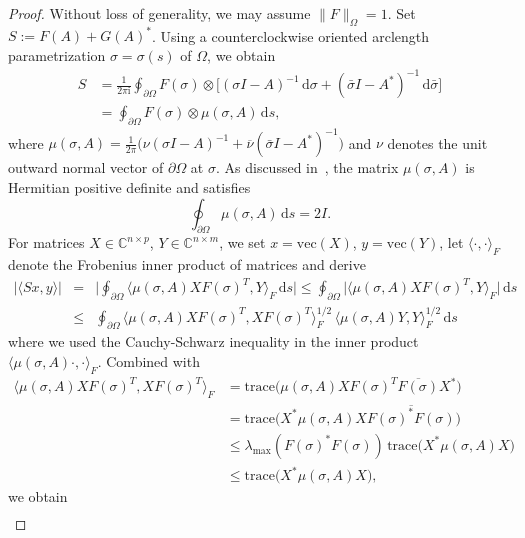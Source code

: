 \documentclass[11pt,a4paper]{amsart}
\newcommand{\C}{{\mathbb C}}
\begin{document}
\begin{proof}
Without loss of generality, we may assume $\|F\|_\Omega = 1$.
Set $S:=F(A)+G(A)^*$. Using a counterclockwise oriented arclength parametrization $\sigma = \sigma(s)$ of $\Omega$, we obtain 
\begin{align*}
 S & = \frac{1}{2\pi \mathrm{i}} \oint_{\partial \Omega} F(\sigma) \otimes \big[ (\sigma I -A)^{-1} \,\mathrm{d}\sigma + (\bar \sigma I -A^*)^{-1} \,\mathrm{d}\bar \sigma \big]  \\
 &= 
 \oint_{\partial \Omega} F(\sigma) \otimes \mu(\sigma,A)\,\mathrm{d}s,
\end{align*}
where $\mu(\sigma,A) = \frac{1}{2\pi}\big(\nu (\sigma I - A)^{-1} + \overline \nu (\bar \sigma I -A^*)^{-1}\big)$ and $\nu$ denotes the unit outward normal vector of $\partial \Omega$ at $\sigma$. As discussed in~\cite[Sec. 2]{CrouzeixPalencia2017}, the matrix $\mu(\sigma,A)$ is Hermitian positive definite and satisfies
\[
 \oint_{\partial \Omega} \mu(\sigma,A)\,\mathrm{d}s = 2I.
\]
For matrices $X \in \C^{n\times p}$, $Y \in \C^{n\times m}$, we set $x = \text{vec}(X)$, $y = \text{vec}(Y)$, let $\langle\cdot,\cdot\rangle_F$ denote the Frobenius inner product of matrices and derive
 \begin{eqnarray*}
 | \langle Sx,y\rangle | &=&  \Big| \oint_{\partial \Omega} \big\langle \mu(\sigma,A)XF(\sigma)^T,Y \big\rangle_F \,\mathrm{d}s \Big| \le 
 \oint_{\partial \Omega} \big| \big\langle \mu(\sigma,A)XF(\sigma)^T,Y \big\rangle_F \big| \,\mathrm{d}s \\
 &\le& \oint_{\partial \Omega} \big\langle \mu(\sigma,A)X F(\sigma)^T,XF(\sigma)^T \big\rangle_F^{1/2}\, \big\langle \mu(\sigma,A)Y,Y \big\rangle_F^{1/2}\,\mathrm{d}s
 \end{eqnarray*}
where we used the Cauchy-Schwarz inequality in the inner product $\langle \mu(\sigma,A) \cdot,\cdot\rangle_F$. Combined with
\begin{align*}
\langle \mu(\sigma,A)XF(\sigma)^T,XF(\sigma)^T \big\rangle_F &=  
 \text{trace}\big( \mu(\sigma,A) X F(\sigma)^T \overline{F(\sigma)} X^* \big) \\ &= 
 \text{trace}\big( X^* \mu(\sigma,A) X \overline{F(\sigma)^* F(\sigma)} \big) \\
 &\le \lambda_{\max}( F(\sigma)^* F(\sigma) )\,\text{trace}\big( X^* \mu(\sigma,A) X  \big) \\ &\le \text{trace}\big( X^* \mu(\sigma,A) X  \big),
\end{align*}
we obtain
 \begin{eqnarray*}

\end{eqnarray*}
\end{proof}
\end{document}
